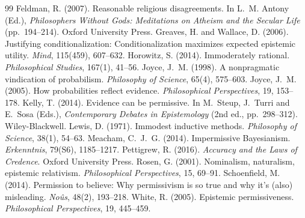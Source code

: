 \documentclass{situationist-preprint}
\begin{document}
\begin{thebibliography}{99}\small
{} Feldman, R. (2007). Reasonable religious disagreements. In L.~M. Antony (Ed.), \emph{Philosophers Without Gods: Meditations on Atheism and the Secular Life} (pp.~194--214). Oxford University Press.
 Greaves, H. and Wallace, D. (2006). Justifying conditionalization: Conditionalization maximizes expected epistemic utility. \emph{Mind}, 115(459), 607--632.
 Horowitz, S. (2014). Immoderately rational. \emph{Philosophical Studies}, 167(1), 41--56.
 Joyce, J.~M. (1998). A nonpragmatic vindication of probabilism. \emph{Philosophy of Science}, 65(4), 575--603.
 Joyce, J.~M. (2005). How probabilities reflect evidence. \emph{Philosophical Perspectives}, 19, 153--178.
 Kelly, T. (2014). Evidence can be permissive. In M.~Steup, J.~Turri and E.~Sosa (Eds.), \emph{Contemporary Debates in Epistemology} (2nd ed., pp.~298--312). Wiley-Blackwell.
 Lewis, D. (1971). Immodest inductive methods. \emph{Philosophy of Science}, 38(1), 54--63.
 Meacham, C.~J.~G. (2014). Impermissive Bayesianism. \emph{Erkenntnis}, 79(S6), 1185--1217.
 Pettigrew, R. (2016). \emph{Accuracy and the Laws of Credence}. Oxford University Press.
 Rosen, G. (2001). Nominalism, naturalism, epistemic relativism. \emph{Philosophical Perspectives}, 15, 69--91.
 Schoenfield, M. (2014). Permission to believe: Why permissivism is so true and why it's (also) misleading. \emph{No\^us}, 48(2), 193--218.
 White, R. (2005). Epistemic permissiveness. \emph{Philosophical Perspectives}, 19, 445--459.
\end{thebibliography}
\end{document}
